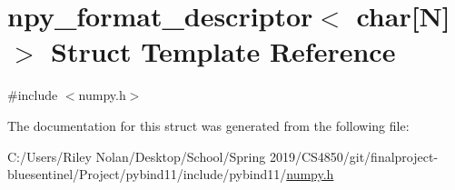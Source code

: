 \hypertarget{structnpy__format__descriptor_3_01char[_n]_4}{}\section{npy\+\_\+format\+\_\+descriptor$<$ char\mbox{[}N\mbox{]}$>$ Struct Template Reference}
\label{structnpy__format__descriptor_3_01char[_n]_4}


{\ttfamily \#include $<$numpy.\+h$>$}



The documentation for this struct was generated from the following file\+:\begin{DoxyCompactItemize}
\item 
C\+:/\+Users/\+Riley Nolan/\+Desktop/\+School/\+Spring 2019/\+C\+S4850/git/finalproject-\/bluesentinel/\+Project/pybind11/include/pybind11/\mbox{\hyperlink{numpy_8h}{numpy.\+h}}\end{DoxyCompactItemize}
